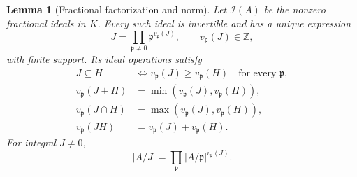 \documentclass[11pt,a4paper]{article}
\newtheorem{lemma}[theorem]{Lemma}
\theoremstyle{definition}\newtheorem{definition}[theorem]{Definition}
\begin{document}
\begin{lemma}[Fractional factorization and norm]\label{lem:sz-factorization}
Let \(\mathcal I(A)\) be the nonzero fractional ideals in \(K\).
Every such ideal is invertible and has a unique expression
\begin{equation}\label{eq:sz-ordinary-factor}
 J=\prod_{\mathfrak p\ne0}\mathfrak p^{v_{\mathfrak p}(J)},
 \qquad v_{\mathfrak p}(J)\in\mathbb Z,
\end{equation}
with finite support. Its ideal operations satisfy
\begin{align*}
 J\subseteq H&\iff v_{\mathfrak p}(J)\ge v_{\mathfrak p}(H)
                  \quad\text{for every }\mathfrak p,\\
 v_{\mathfrak p}(J+H)&=\min(v_{\mathfrak p}(J),v_{\mathfrak p}(H)),\\
 v_{\mathfrak p}(J\cap H)&=\max(v_{\mathfrak p}(J),v_{\mathfrak p}(H)),\\
 v_{\mathfrak p}(JH)&=v_{\mathfrak p}(J)+v_{\mathfrak p}(H).
\end{align*}
For integral \(J\ne0\),
\begin{equation}\label{eq:sz-ordinary-norm}
 |A/J|=\prod_{\mathfrak p}|A/\mathfrak p|^{v_{\mathfrak p}(J)}.
\end{equation}
\end{lemma}
\end{document}
